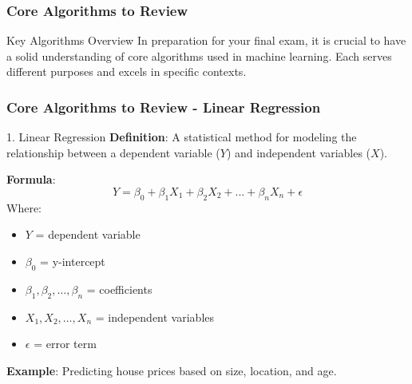 \documentclass[aspectratio=169]{beamer}
\begin{document}
\begin{frame}[fragile]
    \frametitle{Core Algorithms to Review}
    \begin{block}{Key Algorithms Overview}
        In preparation for your final exam, it is crucial to have a solid understanding of core algorithms used in machine learning. Each serves different purposes and excels in specific contexts.
    \end{block}
\end{frame}

\begin{frame}[fragile]
    \frametitle{Core Algorithms to Review - Linear Regression}
    \begin{block}{1. Linear Regression}
        \textbf{Definition}: A statistical method for modeling the relationship between a dependent variable ($Y$) and independent variables ($X$).
        
        \textbf{Formula}: 
        \begin{equation}
            Y = \beta_0 + \beta_1X_1 + \beta_2X_2 + ... + \beta_nX_n + \epsilon
        \end{equation}
        Where:
        \begin{itemize}
            \item $Y$ = dependent variable
            \item $\beta_0$ = y-intercept
            \item $\beta_1, \beta_2, \ldots, \beta_n$ = coefficients
            \item $X_1, X_2, \ldots, X_n$ = independent variables
            \item $\epsilon$ = error term
        \end{itemize}
        
        \textbf{Example}: Predicting house prices based on size, location, and age.
    \end{block}
\end{frame}
\end{document}
